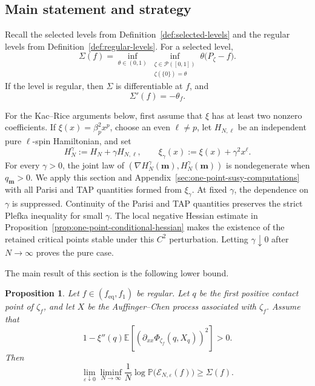 \documentclass[a4paper,10pt,reqno]{amsart}
\numberwithin{equation}{section}
\newtheorem{proposition}{Proposition}[section]
\newcommand{\ve}{\varepsilon}
\newcommand{\dP}{\mathbb{P}}%
\newcommand{\dE}{\mathbb{E}}%
\newcommand{\mc}{\mathcal}
\newcommand{\eq}{\mathrm{eq}}
\newcommand{\bfm}{\mathbf{m}}
\begin{document}
	\subsection{Main statement and strategy}\label{sub:strategy}
	
	Recall the selected levels from Definition~\ref{def:selected-levels} and the
	regular levels from Definition~\ref{def:regular-levels}. For a selected level,
	\begin{equation}\label{eq:selected-level-variational-formula}
		\Sigma(f)
		=
		\inf_{\theta\in(0,1)}
		\inf_{\substack{\zeta\in\mc P([0,1])\\
				\zeta(\{0\})=\theta}}
		\theta\bigl(P_\zeta-f\bigr).
	\end{equation}
	If the level is regular, then \(\Sigma\) is differentiable at \(f\), and
	\[
	\Sigma'(f)=-\theta_f.
	\]
	
	For the Kac--Rice arguments below, first assume that \(\xi\) has at least
	two nonzero coefficients. If
	\(\xi(x)=\beta_p^2x^p\), choose an even \(\ell\ne p\), let
	\(H_{N,\ell}\) be an independent pure \(\ell\)-spin Hamiltonian, and set
	\[
	H_N^\gamma:=H_N+\gamma H_{N,\ell},
	\qquad
	\xi_\gamma(x):=\xi(x)+\gamma^2x^\ell.
	\]
	For every \(\gamma>0\), the joint law of
	\((\nabla H_N^\gamma(\bfm),H_N^\gamma(\bfm))\) is nondegenerate when
	\(q_\bfm>0\). We apply this section and
	Appendix~\ref{sec:one-point-susy-computations} with all Parisi and TAP
	quantities formed from \(\xi_\gamma\). At fixed \(\gamma\), the dependence
	on \(\gamma\) is suppressed. Continuity of the Parisi and TAP quantities
	preserves the strict Plefka inequality for small \(\gamma\). The local
	negative Hessian estimate in
	Proposition~\ref{prop:one-point-conditional-hessian} makes the existence
	of the retained critical points stable under this \(C^2\) perturbation.
	Letting \(\gamma\downarrow0\) after \(N\to\infty\) proves the pure case.
	
	The main result of this section is the following lower bound.
	
	\begin{proposition}\label{prop:onshell-lower-bound}
		Let \(f\in(f_{\eq},f_1)\) be regular. Let \(q\) be the first
		positive contact point of \(\zeta_f\), and let \(X\) be the Auffinger--Chen process
		associated with \(\zeta_f\).
		Assume that
		\[
		1-\xi''(q)\dE\left[
		\left(
		\partial_{xx}\Phi_{\zeta_f}(q,X_q)
		\right)^2
		\right]>0.
		\]
		Then
		\[
		\lim_{\ve\downarrow0}
		\liminf_{N\to\infty}
		\frac1N\log\dP\bigl(\mc E_{N,\ve}(f)\bigr)
		\ge\Sigma(f).
		\]
	\end{proposition}
	
\end{document}
